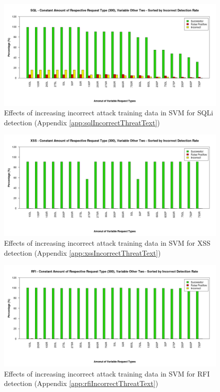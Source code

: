 \begin{figure}[H]
	\centering
	\includegraphics[width=450px]{./assets/results/svm/incorrect/Results_SQL.png}
	\caption{Effects of increasing incorrect attack training data in SVM for SQLi detection (Appendix \ref{app:sqlIncorrectThreatText})}
	\label{fig:resIncorrectSQL}
\end{figure}

\newpage
\begin{figure}[H]
	\centering
	\includegraphics[width=450px]{./assets/appendix/fullresults/svm/incorrect/Results_XSS.png}
	\caption{Effects of increasing incorrect attack training data in SVM for XSS detection (Appendix \ref{app:xssIncorrectThreatText})}
	\label{fig:resIncorrectXSS}
\end{figure}

\begin{figure}[H]
	\centering
	\includegraphics[width=450px]{./assets/appendix/fullresults/svm/incorrect/Results_RFI.png}
	\caption{Effects of increasing incorrect attack training data in SVM for RFI detection (Appendix \ref{app:rfiIncorrectThreatText})}
	\label{fig:resIncorrectRFI}
\end{figure}
